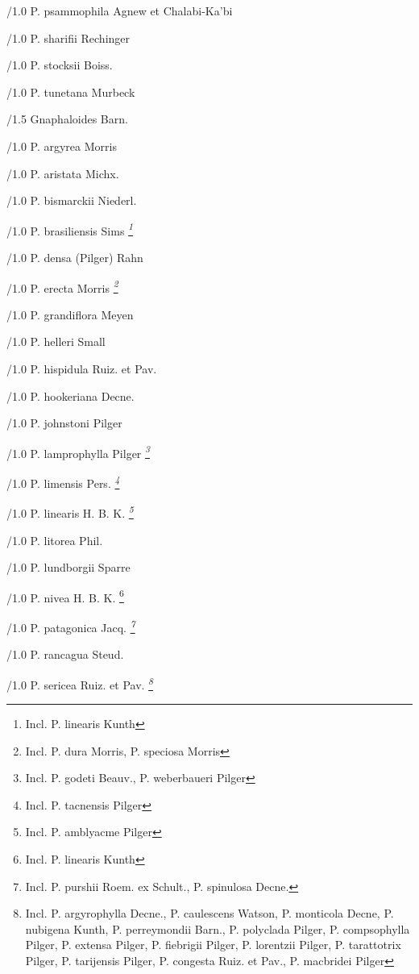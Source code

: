 \documentclass{article}
\begin{document}
\begin{classif}{1.0}
        /1.0 {P. psammophila} Agnew et Chalabi-Ka'bi

        /1.0 {P. sharifii} Rechinger

        /1.0 {P. stocksii} Boiss.

        /1.0 {P. tunetana} Murbeck

/1.5 Gnaphaloides Barn.

        /1.0 {P. argyrea} Morris

        /1.0 {P. aristata} Michx.

        /1.0 {P. bismarckii} Niederl.

        /1.0 {P. brasiliensis} Sims \sl \footnote{Incl. \KURN P.
        linearis Kunth \Pp}

        /1.0 {P. densa} (Pilger) Rahn

        /1.0 {P. erecta} Morris \sl \footnote{Incl. \KURN P.
        dura Morris, \KURN P. speciosa Morris}

        /1.0 {P. grandiflora} Meyen

        /1.0 {P. helleri} Small

        /1.0 {P. hispidula} Ruiz. et Pav.

        /1.0 {P. hookeriana} Decne.

        /1.0 {P. johnstoni} Pilger

        /1.0 {P. lamprophylla} Pilger \sl \footnote{Incl. \KURN
        P. godeti Beauv., \KURN P. weberbaueri Pilger}

        /1.0 {P. limensis} Pers. \sl \footnote{Incl. \KURN P.
        tacnensis Pilger}

        /1.0 {P. linearis} H. B. K. \sl \footnote{Incl. \KURN P.
        amblyacme Pilger}

        /1.0 {P. litorea} Phil.

        /1.0 {P. lundborgii} Sparre

        /1.0 {P. nivea} H. B. K. \footnote{Incl. \KURN P.
        linearis Kunth \Pp}

        /1.0 {P. patagonica} Jacq. \sl \footnote{Incl. \KURN P.
        purshii Roem. ex Schult., \KURN P. spinulosa Decne.}

        /1.0 {P. rancagua} Steud.

        /1.0 {P. sericea} Ruiz. et Pav. \sl \footnote{Incl.
        \KURN P. argyrophylla Decne., \KURN P. caulescens
        Watson, \KURN P. monticola Decne, \KURN P. nubigena
        Kunth, \KURN P. perreymondii Barn., \KURN P. polyclada
        Pilger, \KURN P. compsophylla Pilger, \KURN P. extensa
        Pilger, \KURN P. fiebrigii Pilger, \KURN P. lorentzii
        Pilger, \KURN P. tarattotrix Pilger, \KURN P. tarijensis
        Pilger, \KURN P. congesta Ruiz. et Pav., \KURN P.
        macbridei Pilger}


\end{classif}
\end{document}
